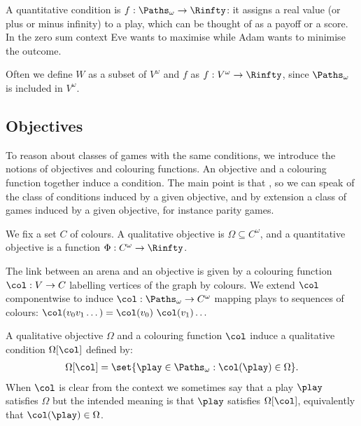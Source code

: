\documentclass[letterpaper,10pt,english]{sphinxmanual}
\begin{document}
A quantitative condition is \(f : \Paths_\omega \to \Rinfty\): it
assigns a real value (or plus or minus infinity) to a play, which can be
thought of as a payoff or a score. In the zero sum context Eve wants to
maximise while Adam wants to minimise the outcome.

Often we define \(W\) as a subset of \(V^\omega\) and \(f\) as
\(f : V^\omega \to \Rinfty\), since \(\Paths_\omega\) is included in
\(V^\omega\).


\subsection{Objectives}
\label{\detokenize{1_Introduction/simple:objectives}}\label{\detokenize{1_Introduction/simple:subsec-objectives}}
To reason about classes of games with the same conditions, we introduce
the notions of objectives and colouring functions. An objective
and a colouring function together induce a condition. The main point is
that , so we can speak of the
class of conditions induced by a given objective, and by extension a
class of games induced by a given objective, for instance parity games.

We fix a set \(C\) of colours. A qualitative objective is
\(\Omega \subseteq C^\omega\), and a quantitative objective is a
function \(\Phi : C^\omega \to \Rinfty\).

The link between an arena and an objective is given by a colouring
function \(\col : V \to C\) labelling vertices of the graph by
colours. We extend \(\col\) componentwise to induce
\(\col : \Paths_\omega \to C^\omega\) mapping plays to sequences of
colours:
\(\col(v_0 v_1 \dots) = \col(v_0)\ \col(v_1) \dots\)

A qualitative objective \(\Omega\) and a colouring function \(\col\) induce a
qualitative condition \(\Omega[\col]\) defined by:
\begin{equation*}
\begin{split}\Omega[\col] = \set{\play \in \Paths_\omega : \col(\play) \in \Omega}.\end{split}
\end{equation*}
When \(\col\) is clear from the context we sometimes say that a play
\(\play\) satisfies \(\Omega\) but the intended meaning is that \(\play\)
satisfies \(\Omega[\col]\), equivalently that \(\col(\play) \in \Omega\).
\end{document}

